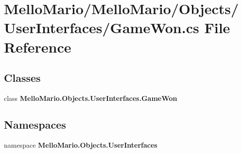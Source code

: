 \section{Mello\+Mario/\+Mello\+Mario/\+Objects/\+User\+Interfaces/\+Game\+Won.cs File Reference}
\label{GameWon_8cs}
\subsection*{Classes}
\begin{DoxyCompactItemize}
\item 
class \textbf{ Mello\+Mario.\+Objects.\+User\+Interfaces.\+Game\+Won}
\end{DoxyCompactItemize}
\subsection*{Namespaces}
\begin{DoxyCompactItemize}
\item 
namespace \textbf{ Mello\+Mario.\+Objects.\+User\+Interfaces}
\end{DoxyCompactItemize}
